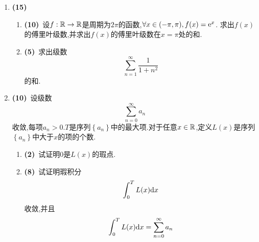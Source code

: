 \documentclass{ctexart}
\begin{document}
\begin{enumerate}[leftmargin=*,label=\textbf{\arabic*.},topsep=0pt,parsep=0pt,itemsep=0pt,partopsep=0pt]
    \item \textbf{(15)}\ \begin{enumerate}[label=\tbf{(\arabic*)},topsep=0pt,parsep=0pt,itemsep=0pt,partopsep=0pt]
            \item \textbf{(10)}\ 设$f:\mathbb{R}\to\mathbb{R}$是周期为$2\pi$的函数,$\forall x\in(-\pi,\pi),f(x)=\mathrm{e}^x$.%
                求出$f(x)$的傅里叶级数,并求出$f(x)$的傅里叶级数在$x=\pi$处的和.
            \item \textbf{(5)}\ 求出级数
                \[\sum_{n=1}^{\infty}\dfrac{1}{1+n^2}\]
                的和.
        \end{enumerate}

    \item \textbf{(10)}\ 设级数
        \[\sum_{n=0}^{\infty}a_n\]
        收敛,每项$a_n>0$.$T$是序列$\left\{a_n\right\}$中的最大项.对于任意$x\in\mathbb{R}$,定义$L(x)$是序列$\left\{a_n\right\}$中大于$x$的项的个数.
        \begin{enumerate}[label=\tbf{(\arabic*)},topsep=0pt,parsep=0pt,itemsep=0pt,partopsep=0pt]
            \item \textbf{(2)}\ 试证明$0$是$L(x)$的瑕点.
            \item \textbf{(8)}\ 试证明瑕积分
                \[\int_0^TL(x)\mathrm{d} x\]
                收敛,并且
                \[\int_0^TL(x)\mathrm{d} x=\sum_{n=0}^{\infty}a_n\]
        \end{enumerate}

\end{enumerate}
\end{document}
